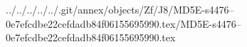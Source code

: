 ../../../../../.git/annex/objects/Zf/J8/MD5E-s4476--0e7efcdbe22cefdadb84f06155695990.tex/MD5E-s4476--0e7efcdbe22cefdadb84f06155695990.tex